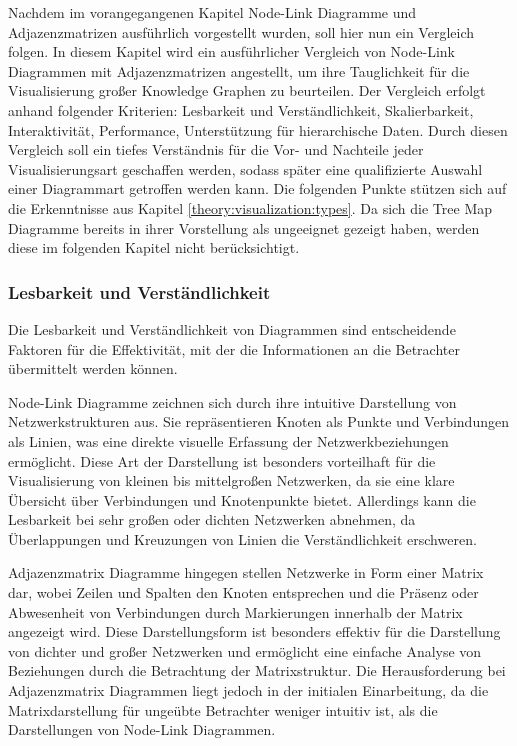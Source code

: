 Nachdem im vorangegangenen Kapitel Node-Link Diagramme und Adjazenzmatrizen ausführlich vorgestellt wurden, soll hier nun ein Vergleich folgen. In diesem Kapitel wird ein ausführlicher Vergleich von Node-Link Diagrammen mit Adjazenzmatrizen angestellt, um ihre Tauglichkeit für die Visualisierung großer Knowledge Graphen zu beurteilen. Der Vergleich erfolgt anhand folgender Kriterien: Lesbarkeit und Verständlichkeit, Skalierbarkeit, Interaktivität, Performance, Unterstützung für hierarchische Daten. Durch diesen Vergleich soll ein tiefes Verständnis für die Vor- und Nachteile jeder Visualisierungsart geschaffen werden, sodass später eine qualifizierte Auswahl einer Diagrammart getroffen werden kann. Die folgenden Punkte stützen sich auf die Erkenntnisse aus Kapitel \ref{theory:visualization:types}. Da sich die Tree Map Diagramme bereits in ihrer Vorstellung als ungeeignet gezeigt haben, werden diese im folgenden Kapitel nicht berücksichtigt.

\subsubsection{Lesbarkeit und Verständlichkeit}
\label{theory:visualization:comparison:readability}

Die Lesbarkeit und Verständlichkeit von Diagrammen sind entscheidende Faktoren für die Effektivität, mit der die Informationen an die Betrachter übermittelt werden können.

Node-Link Diagramme zeichnen sich durch ihre intuitive Darstellung von Netzwerkstrukturen aus. Sie repräsentieren Knoten als Punkte und Verbindungen als Linien, was eine direkte visuelle Erfassung der Netzwerkbeziehungen ermöglicht. Diese Art der Darstellung ist besonders vorteilhaft für die Visualisierung von kleinen bis mittelgroßen Netzwerken, da sie eine klare Übersicht über Verbindungen und Knotenpunkte bietet. Allerdings kann die Lesbarkeit bei sehr großen oder dichten Netzwerken abnehmen, da Überlappungen und Kreuzungen von Linien die Verständlichkeit erschweren.

Adjazenzmatrix Diagramme hingegen stellen Netzwerke in Form einer Matrix dar, wobei Zeilen und Spalten den Knoten entsprechen und die Präsenz oder Abwesenheit von Verbindungen durch Markierungen innerhalb der Matrix angezeigt wird. Diese Darstellungsform ist besonders effektiv für die Darstellung von dichter und großer Netzwerken und ermöglicht eine einfache Analyse von Beziehungen durch die Betrachtung der Matrixstruktur. Die Herausforderung bei Adjazenzmatrix Diagrammen liegt jedoch in der initialen Einarbeitung, da die Matrixdarstellung für ungeübte Betrachter weniger intuitiv ist, als die Darstellungen von Node-Link Diagrammen.

